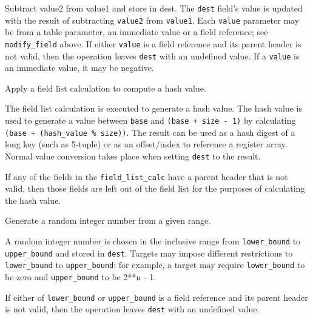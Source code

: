 \documentclass[12pt]{article}
\begin{document}

{ %
Subtract value2 from value1 and store in dest.
}
{ %
}
{ %
The \texttt{dest} field's value is updated with the result of subtracting
\texttt{value2} from \texttt{value1}. Each \texttt{value} parameter may be from a
table parameter, an immediate value or a field reference; see \texttt{modify_field} above.  If either \texttt{value}
is a field reference and its parent header is not valid, then the operation
leaves \texttt{dest} with an undefined value. If a
\texttt{value} is an immediate value, it may be negative.
}


{ %
{Apply a field list calculation to compute a hash value.}
}
{ %
}
{ %
The field list calculation is executed to generate a hash value.  
The hash value is used to generate a value between \texttt{base} and 
\texttt{(base + size - 1)} by calculating \texttt{(base + (hash_value \% size))}. 
The result can be used as a hash digest of a long key (such as 5-tuple) or as 
an offset/index to reference a register array. Normal value conversion 
takes place when setting \texttt{dest} to the result.

If any of the fields in the \texttt{field_list_calc} have a parent
header that is not valid, then those fields are left out of the field list for the purposes of calculating the hash value.
}


{ %
Generate a random integer number from a given range.
}
{ %
}
{ %
A random integer number is chosen in the inclusive range from \texttt{lower_bound} to \texttt{upper_bound}
and stored in \texttt{dest}. 
Targets may impose different restrictions to \texttt{lower_bound} to \texttt{upper_bound}: 
for example, a target may require \texttt{lower_bound} 
to be zero and \texttt{upper_bound} to be 2**n - 1.

If either of \texttt{lower_bound} or \texttt{upper_bound} is a field reference
and its parent header is not valid, then the operation leaves
\texttt{dest} with an undefined value.
}
\end{document}
